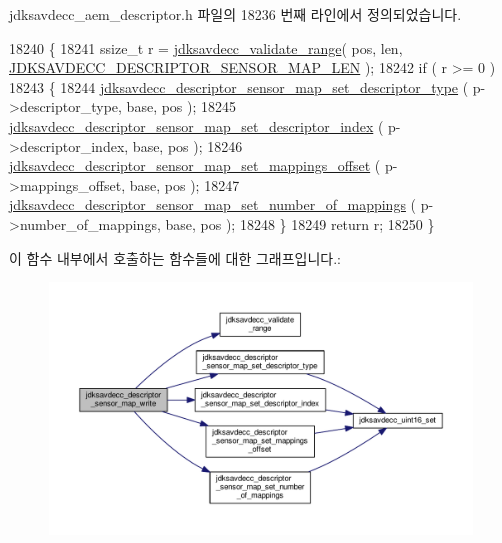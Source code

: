 jdksavdecc\+\_\+aem\+\_\+descriptor.\+h 파일의 18236 번째 라인에서 정의되었습니다.


\begin{DoxyCode}
18240 \{
18241     ssize\_t r = \hyperlink{group__util_ga9c02bdfe76c69163647c3196db7a73a1}{jdksavdecc\_validate\_range}( pos, len, 
      \hyperlink{group__descriptor__sensor__map_ga4eeb103a929997c905f5bc7233926d5f}{JDKSAVDECC\_DESCRIPTOR\_SENSOR\_MAP\_LEN} );
18242     \textcolor{keywordflow}{if} ( r >= 0 )
18243     \{
18244         \hyperlink{group__descriptor__sensor__map_ga5b64c2dc771380835c64f8deee625df3}{jdksavdecc\_descriptor\_sensor\_map\_set\_descriptor\_type}
      ( p->descriptor\_type, base, pos );
18245         \hyperlink{group__descriptor__sensor__map_gaf17a3bc1ba205b94069539b5bb58d25d}{jdksavdecc\_descriptor\_sensor\_map\_set\_descriptor\_index}
      ( p->descriptor\_index, base, pos );
18246         \hyperlink{group__descriptor__sensor__map_ga5d57294a409fc4f3df74ffe82e9398f5}{jdksavdecc\_descriptor\_sensor\_map\_set\_mappings\_offset}
      ( p->mappings\_offset, base, pos );
18247         \hyperlink{group__descriptor__sensor__map_gaada6c4c8124ed75a7dab9fd9b58397cf}{jdksavdecc\_descriptor\_sensor\_map\_set\_number\_of\_mappings}
      ( p->number\_of\_mappings, base, pos );
18248     \}
18249     \textcolor{keywordflow}{return} r;
18250 \}
\end{DoxyCode}


이 함수 내부에서 호출하는 함수들에 대한 그래프입니다.\+:
\nopagebreak
\begin{figure}[H]
\begin{center}
\leavevmode
\includegraphics[width=350pt]{group__descriptor__sensor__map_gaa6a7d0f61181c3601d20daf2c6c0e963_cgraph}
\end{center}
\end{figure}


